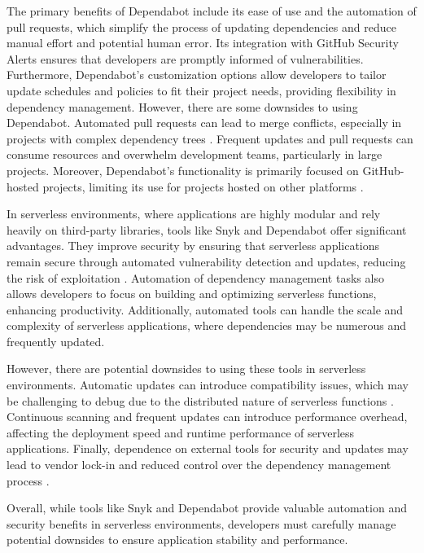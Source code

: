 \documentclass[12pt, letterpaper]{article}
\begin{document}
The primary benefits of Dependabot include its ease of use and the automation of pull requests, which simplify the process of updating dependencies and reduce manual effort and potential human error. Its integration with GitHub Security Alerts ensures that developers are promptly informed of vulnerabilities. Furthermore, Dependabot's customization options allow developers to tailor update schedules and policies to fit their project needs, providing flexibility in dependency management. However, there are some downsides to using Dependabot. Automated pull requests can lead to merge conflicts, especially in projects with complex dependency trees \cite{dependabotMerge2023}. Frequent updates and pull requests can consume resources and overwhelm development teams, particularly in large projects. Moreover, Dependabot's functionality is primarily focused on GitHub-hosted projects, limiting its use for projects hosted on other platforms \cite{dependabotScope2023}.

In serverless environments, where applications are highly modular and rely heavily on third-party libraries, tools like Snyk and Dependabot offer significant advantages. They improve security by ensuring that serverless applications remain secure through automated vulnerability detection and updates, reducing the risk of exploitation \cite{serverlessSecurity2023}. Automation of dependency management tasks also allows developers to focus on building and optimizing serverless functions, enhancing productivity. Additionally, automated tools can handle the scale and complexity of serverless applications, where dependencies may be numerous and frequently updated.

However, there are potential downsides to using these tools in serverless environments. Automatic updates can introduce compatibility issues, which may be challenging to debug due to the distributed nature of serverless functions \cite{benischke2023updates}. Continuous scanning and frequent updates can introduce performance overhead, affecting the deployment speed and runtime performance of serverless applications. Finally, dependence on external tools for security and updates may lead to vendor lock-in and reduced control over the dependency management process \cite{kavis2014cloud}.

Overall, while tools like Snyk and Dependabot provide valuable automation and security benefits in serverless environments, developers must carefully manage potential downsides to ensure application stability and performance.
\end{document}
